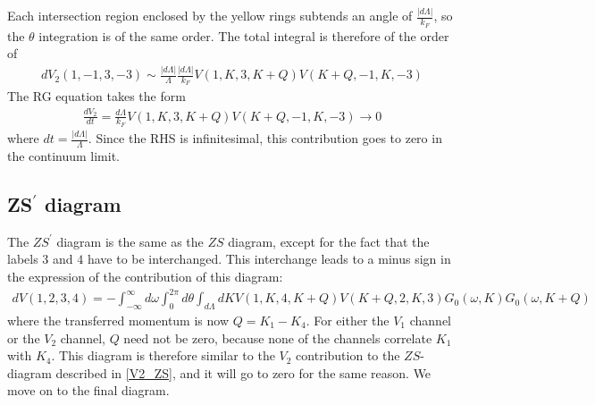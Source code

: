 \documentclass[12pt]{article}
\begin{document}
Each intersection region enclosed by the yellow rings subtends an angle of \(\frac{|d\Lambda|}{k_F}\), so the \(\theta\) integration is of the same order. The total integral is therefore of the order of
\begin{equation}\begin{aligned}
	dV_2(1,-1,3,-3) \sim \frac{|d\Lambda|}{\Lambda}\frac{|d\Lambda|}{k_F} V(1,K,3,K+Q) V(K+Q, -1, K, -3)
\end{aligned}\end{equation}
The RG equation takes the form
\begin{equation}\begin{aligned}
	\frac{d V_2}{dt} = \frac{d\Lambda}{k_F} V(1,K,3,K+Q) V(K+Q, -1, K, -3) \to 0
\end{aligned}\end{equation}
where \(dt = \frac{|d\Lambda|}{\Lambda}\). Since the RHS is infinitesimal, this contribution goes to zero in the continuum limit.
\subsection{ZS\(^\prime\) diagram}
The \(ZS^\prime\) diagram is the same as the \(ZS\) diagram, except for the fact that the labels \(3\) and \(4\) have to be interchanged. This interchange leads to a minus sign in the expression of the contribution of this diagram:
\begin{equation}\begin{aligned}
	dV(1,2,3,4) = -\int_{-\infty}^\infty d\omega  \int_0^{2\pi} d\theta \int_{d\Lambda}dK V(1,K,4,K+Q) V(K+Q, 2, K, 3) G_0(\omega, K)G_0(\omega, K+Q)
\end{aligned}\end{equation}
where the transferred momentum is now \(Q=K_1 - K_4\). For either the \(V_1\) channel or the \(V_2\) channel, \(Q\) need not be zero, because none of the channels correlate \(K_1\) with \(K_4\). This diagram is therefore similar to the \(V_2\) contribution to the \(ZS\)-diagram described in \ref{V2_ZS}, and it will go to zero for the same reason. We move on to the final diagram.
\end{document}
